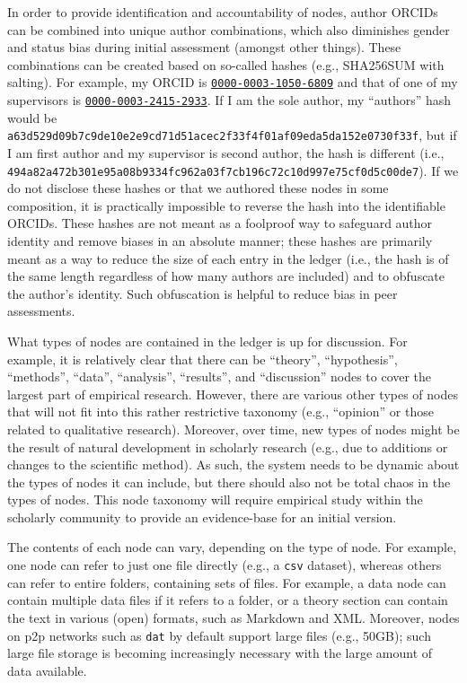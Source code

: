 \documentclass[]{tufte-book}
\begin{document}
In order to provide identification and accountability of nodes, author
ORCIDs can be combined into unique author combinations, which also
diminishes gender and status bias during initial assessment (amongst
other things). These combinations can be created based on so-called
hashes (e.g., SHA256SUM with salting). For example, my ORCID is
\href{http://orcid.org/0000-0003-1050-6809}{\texttt{0000-0003-1050-6809}}
and that of one of my supervisors is
\href{http://orcid.org/0000-0003-2415-2933}{\texttt{0000-0003-2415-2933}}.
If I am the sole author, my ``authors'' hash would be
\texttt{a63d529d09b7c9de10e2e9cd71d51acec2f33f4f01af09eda5da152e0730f33f},
but if I am first author and my supervisor is second author, the hash is
different (i.e.,
\texttt{494a82a472b301e95a08b9334fc962a03f7cb196c72c10d997e75cf0d5c00de7}).
If we do not disclose these hashes or that we authored these nodes in
some composition, it is practically impossible to reverse the hash into
the identifiable ORCIDs. These hashes are not meant as a foolproof way
to safeguard author identity and remove biases in an absolute manner;
these hashes are primarily meant as a way to reduce the size of each
entry in the ledger (i.e., the hash is of the same length regardless of
how many authors are included) and to obfuscate the author's identity.
Such obfuscation is helpful to reduce bias in peer assessments.

What types of nodes are contained in the ledger is up for discussion.
For example, it is relatively clear that there can be ``theory'',
``hypothesis'', ``methods'', ``data'', ``analysis'', ``results'', and
``discussion'' nodes to cover the largest part of empirical research.
However, there are various other types of nodes that will not fit into
this rather restrictive taxonomy (e.g., ``opinion'' or those related to
qualitative research). Moreover, over time, new types of nodes might be
the result of natural development in scholarly research (e.g., due to
additions or changes to the scientific method). As such, the system
needs to be dynamic about the types of nodes it can include, but there
should also not be total chaos in the types of nodes. This node taxonomy
will require empirical study within the scholarly community to provide
an evidence-base for an initial version.

The contents of each node can vary, depending on the type of node. For
example, one node can refer to just one file directly (e.g., a
\texttt{csv} dataset), whereas others can refer to entire folders,
containing sets of files. For example, a data node can contain multiple
data files if it refers to a folder, or a theory section can contain the
text in various (open) formats, such as Markdown and XML. Moreover,
nodes on p2p networks such as \texttt{dat} by default support large
files (e.g., 50GB); such large file storage is becoming increasingly
necessary with the large amount of data available.
\end{document}
